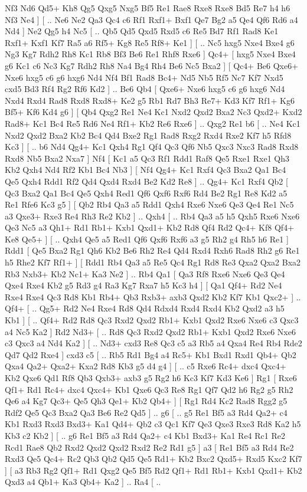 Nf3 Nd6  Qd5+ Kh8  Qg5 Qxg5  Nxg5 Bf5  Re1 Rae8  Rxe8 Rxe8  Bd5 Re7  h4 h6  Nf3 Ne4   ]  [ .. Ne6  Ne2 Qa3  Qc4 c6  Rf1 Rxf1+  Bxf1 Qe7  Bg2 a5  Qe4 Qf6  Rd6 a4  Nd4   ]  Ne2   Qg5    h4   Nc5 [ .. Qb5  Qd5 Qxd5  Rxd5 c6  Re5 Bd7  Rf1 Rad8  Ke1 Rxf1+  Kxf1 Kf7  Ra5 a6  Rf5+ Kg8  Re5 Rf8+  Ke1   ]  [ .. Nc5  hxg5 Nxe4  Bxe4 g6  Ng3 Kg7  Rdh2 Rh8  Kc1 Rb8  Bf3 Be6  Re1 Rhf8  Rxe6   ]  Qc4+ [  hxg5 Nxe4  Bxe4 g6  Kc1 c6  Nc3 Kg7  Rdh2 Rh8  Na4 Bg4  Rh4 Be6  Nc5 Bxa2   ]  [  Qc4+ Be6  Qxe6+ Nxe6  hxg5 c6  g6 hxg6  Nd4 Nf4  Bf1 Rad8  Bc4+ Nd5  Nb5 Rf5  Nc7 Kf7  Nxd5 cxd5  Bd3 Rf4  Rg2 Rf6  Kd2   ] .. Be6    Qb4 [  Qxe6+ Nxe6  hxg5 c6  g6 hxg6  Nd4 Nxd4  Rxd4 Rad8  Rxd8 Rxd8+  Ke2 g5  Rb1 Rd7  Bh3 Re7+  Kd3 Kf7  Rf1+ Kg6  Bf5+ Kf6  Kd4 g6   ]  [  Qb4 Qxg2  Re1 Ne4  Kc1 Nxd2  Qxd2 Bxa2  Nc3 Qxd2+  Kxd2 Rad8+  Kc1 Bc4  Re5 Rd6  Ne4 Rf1+  Kb2 Re6  Rxe6   ] .. Qxg2    Re1   b6 [ .. Ne4  Kc1 Nxd2  Qxd2 Bxa2  Kb2 Bc4  Qd4 Bxe2  Rg1 Rad8  Rxg2 Rxd4  Rxe2 Kf7  h5 Rfd8  Kc3   ]  [ .. b6  Nd4 Qg4+  Kc1 Qxh4  Rg1 Qf4  Qc3 Qf6  Nb5 Qxc3  Nxc3 Rad8  Rxd8 Rxd8  Nb5 Bxa2  Nxa7   ]  Nf4 [  Kc1 a5  Qc3 Rf1  Rdd1 Raf8  Qe5 Rxe1  Rxe1 Qh3  Kb2 Qxh4  Nd4 Rf2  Kb1 Bc4  Nb3   ]  [  Nf4 Qg4+  Kc1 Rxf4  Qc3 Bxa2  Qa1 Bc4  Qe5 Qxh4  Rdd1 Rf2  Qd4 Qxd4  Rxd4 Be2  Kd2 Re8   ] .. Qg4+    Kc1   Rxf4    Qb2 [  Qc3 Bxa2  Qa1 Bc4  Qe5 Qxh4  Red1 Qf6  Qxf6 Rxf6  Rd4 Be2  Rg1 Re8  Kd2 a5  Re1 Rfe6  Kc3 g5   ]  [  Qb2 Rb4  Qa3 a5  Rdd1 Qxh4  Rxe6 Nxe6  Qe3 Qe4  Re1 Nc5  a3 Qxe3+  Rxe3 Re4  Rh3 Re2  Kb2   ] .. Qxh4 [ .. Rb4  Qa3 a5  h5 Qxh5  Rxe6 Nxe6  Qe3 Nc5  a3 Qh1+  Rd1 Rb1+  Kxb1 Qxd1+  Kb2 Rd8  Qf4 Rd2  Qc4+ Kf8  Qf4+ Ke8  Qe5+   ]  [ .. Qxh4  Qe5 a5  Red1 Qf6  Qxf6 Rxf6  a3 g5  Rh2 g4  Rh5 h6  Re1   ]  Rdd1 [  Qe5 Bxa2  Rg1 Qh6  Kb2 Be6  Rh2 Re4  Qd4 Rxd4  Rxh6 Rad8  Rh2 g6  Re1 h5  Rhe2 Kf7  Rf1+   ]  [  Rdd1 Rb4  Qa3 a5  Re5 Qc4  Rg1 Rd8  Re3 Qxa2  Qxa2 Bxa2  Rb3 Nxb3+  Kb2 Nc1+  Ka3 Ne2   ] .. Rb4    Qa1 [  Qa3 Rf8  Rxe6 Nxe6  Qe3 Qe4  Qxe4 Rxe4  Kb2 g5  Rd3 g4  Ra3 Kg7  Rxa7 h5  Kc3 h4   ]  [  Qa1 Qf4+  Rd2 Ne4  Rxe4 Rxe4  Qc3 Rd8  Kb1 Rb4+  Qb3 Rxb3+  axb3 Qxd2  Kb2 Kf7  Kb1 Qxc2+   ] .. Qf4+ [ .. Qg5+  Rd2 Ne4  Rxe4 Rd8  Qd4 Rdxd4  Rxd4 Rxd4  Kb2 Qxd2  a3 h5  Kb1   ]  [ .. Qf4+  Rd2 Rd8  Qc3 Rxd2  Qxd2 Rb1+  Kxb1 Qxd2  Rxe6 Nxe6  c3 Qxc3  a4 Nc5  Ka2   ]  Rd2   Nd3+ [ .. Rd8  Qc3 Rxd2  Qxd2 Rb1+  Kxb1 Qxd2  Rxe6 Nxe6  c3 Qxc3  a4 Nd4  Ka2   ]  [ .. Nd3+  cxd3 Re8  Qc3 c5  a3 Rb5  a4 Qxa4  Re4 Rb4  Rde2 Qd7  Qd2 Rxe4   ]  cxd3   c5 [ .. Rb5  Rd1 Bg4  a4 Rc5+  Kb1 Bxd1  Rxd1 Qb4+  Qb2 Qxa4  Qa2+ Qxa2+  Kxa2 Rd8  Kb3 g5  d4 g4   ]  [ .. c5  Rxe6 Rc4+  dxc4 Qxc4+  Kb2 Qxe6  Qd1 Rf8  Qb3 Qxb3+  axb3 g5  Rg2 h6  Kc3 Kf7  Kd3 Ke6   ]  Rg1 [  Rxe6 Qf1+  Rd1 Rc4+  dxc4 Qxc4+  Kb1 Qxe6  Qc3 Re8  Rg1 Qf7  Qd2 h6  Rg2 g5  Rh2 Qe6  a4 Kg7  Qc3+ Qe5  Qh3 Qe1+  Kb2 Qb4+   ]  [  Rg1 Rd4  Kc2 Rad8  Rgg2 g5  Rdf2 Qe5  Qc3 Bxa2  Qa3 Be6  Re2 Qd5   ] .. g6 [ .. g5  Re1 Bf5  a3 Rd4  Qa2+ c4  Kb1 Rxd3  Rxd3 Bxd3+  Ka1 Qd4+  Qb2 c3  Qc1 Kf7  Qe3 Qxe3  Rxe3 Rd8  Ka2 h5  Kb3 c2  Kb2   ]  [ .. g6  Re1 Bf5  a3 Rd4  Qa2+ c4  Kb1 Bxd3+  Ka1 Re4  Rc1 Re2  Rcd1 Rae8  Qb2 Rxd2  Qxd2 Qxd2  Rxd2 Re2  Rd1 g5   ]  a3 [  Re1 Bf5  a3 Rd4  Re2 Rxd3  Qe5 Qc4+  Rc2 Qb3  Qb2 Qd5  Qe5 Rd1+  Kb2 Bxc2  Qxd5+ Rxd5  Kxc2 Kf7   ]  [  a3 Rb3  Rg2 Qf1+  Rd1 Qxg2  Qe5 Bf5  Rd2 Qf1+  Rd1 Rb1+  Kxb1 Qxd1+  Kb2 Qxd3  a4 Qb1+  Ka3 Qb4+  Ka2   ] .. Ra4 [ .. 